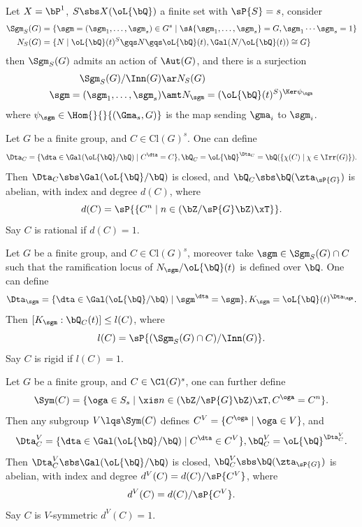 \documentclass[0-main]{subfiles}
\begin{document}
\begin{thm}
	Let $X=\bP^{1}$, $S\sbs X(\oL{\bQ})$ a finite set with $\sP{S}=s$, consider
	\begin{align*}
	  \Sgm_{S}(G) &= \{\sgm=(\sgm_{1},\ldots,\sgm_{s})\in G^{s}\mid \sA{\sgm_{1},\ldots,\sgm_{s}}=G, \sgm_{1}\cdots\sgm_{s}=1\} \\
	  N_{S}(G) &= \{N\mid \oL{\bQ}(t)^{S}\gqs N\gqs \oL{\bQ}(t), \Gal(N/\oL{\bQ}(t))\cong G\}
	\end{align*}
	then $\Sgm_{S}(G)$ admits an action of $\Aut(G)$, and there is a surjection
	\begin{align*}
		\Sgm_{S}(G)/\Inn(G)&\ar N_{S}(G) \\
		\sgm=(\sgm_{1},\ldots,\sgm_{s})&\amt N_{\sgm}=(\oL{\bQ}(t)^{S})^{\Ker\psi_{\sgm}}
	\end{align*}
	where $\psi_{\sgm}\in\Hom{}{}{(\Gma_{s},G)}$ is the map sending $\gma_{i}$ to $\sgm_{i}$.
\end{thm}

\begin{thm}[Proposition~4.4]
	Let $G$ be a finite group, and $C\in \mathrm{Cl}(G)^{s}$. One can define
	\[
		\Dta_{C} = \{\dta\in\Gal(\oL{\bQ}/\bQ)\mid C^{\dta}=C\}, \bQ_{C} = \oL{\bQ}^{\Dta_{C}}=\bQ(\{\chi(C)\mid\chi\in\Irr(G)\}).
	\]
	Then $\Dta_{C}\sbs\Gal(\oL{\bQ}/\bQ)$ is closed, and $\bQ_{C}\sbs\bQ(\zta_{\sP{G}})$ is abelian, with index and degree $d(C)$, where
	\[
		d(C)=\sP{\{C^{n}\mid n\in (\bZ/\sP{G}\bZ)\xT\}}.
	\]
	Say $C$ is rational if $d(C)=1$.
\end{thm}

\begin{thm}[Theorem~4.5]
	Let $G$ be a finite group, and $C\in \mathrm{Cl}(G)^{s}$, moreover take $\sgm\in\Sgm_{S}(G)\cap C$ such that the ramification locus of $N_{\sgm}/\oL{\bQ}(t)$ is defined over $\bQ$. One can define
	\[
	  \Dta_{\sgm} = \{\dta\in\Gal(\oL{\bQ}/\bQ)\mid \sgm^{\dta}=\sgm\}, K_{\sgm} = \oL{\bQ}(t)^{\Dta_{\sgm}}.
	 \]
	Then $[K_{\sgm}:\bQ_{C}(t)]\leq l(C)$, where
	\[
		l(C)=\sP{(\Sgm_{S}(G)\cap C)/\Inn(G)}.
	\]
	Say $C$ is rigid if $l(C)=1$.
\end{thm}

\begin{thm}[Proposition~4.9]
	Let $G$ be a finite group, and $C\in\Cl(G)^{s}$, one can further define
	\[
		\Sym(C)=\{\oga\in S_{s}\mid \xis n\in(\bZ/\sP{G}\bZ)\xT, C^{\oga}=C^{n}\}.
	\]
	Then any subgroup $V\lqs\Sym(C)$ defines $C^{V}=\{C^{\oga}\mid \oga\in V\}$, and
	\[
		\Dta_{C}^{V}=\{\dta\in\Gal(\oL{\bQ}/\bQ)\mid C^{\dta}\in C^{V}\}, \bQ_{C}^{V}=\oL{\bQ}^{\Dta_{C}^{V}}.
	\]
	Then $\Dta_{C}^{V}\sbs\Gal(\oL{\bQ}/\bQ)$ is closed, $\bQ_{C}^{V}\sbs\bQ(\zta_{\sP{G}})$ is abelian, with index and degree $d^{V}(C)=d(C)/\sP{C^{V}}$, where
	\[
		d^{V}(C)=d(C)/\sP{C^{V}}.
	\]
	Say $C$ is $V$-symmetric $d^{V}(C)=1$.
\end{thm}
\end{document}
